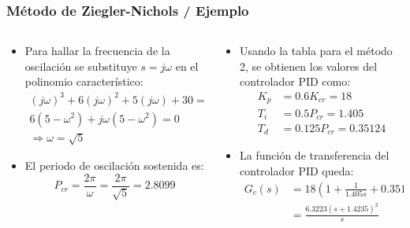 \documentclass[aspectratio=169]{beamer}
\theoremstyle{definition}
\theoremstyle{plain}
\theoremstyle{remark}
\begin{document}
\begin{frame}[<+->]\frametitle{Método de Ziegler-Nichols / Ejemplo}
\begin{columns}
\begin{column}{0.5\textwidth}
\small
\begin{itemize}
	\item Para hallar la frecuencia de la oscilación se substituye $s = j\omega$ en el polinomio característico:
	\begin{align*}
		(j\omega)^3 + 6(j\omega)^2 + 5(j\omega) + 30 = 0\\
		6(5 - \omega^2) + j\omega(5-\omega^2) = 0\\
		\Rightarrow \omega = \sqrt{5}
	\end{align*}
	\item El periodo de oscilación sostenida es:
	\begin{equation*}
		P_{cr} = \frac{2\pi}{\omega} = \frac{2\pi}{\sqrt{5}} = 2.8099
	\end{equation*}
\end{itemize}
\end{column}
\begin{column}{0.5\textwidth}
\small
\begin{itemize}
	\item Usando la tabla para el método 2, se obtienen los valores del controlador PID como:
	\begin{align*}
		K_p &= 0.6 K_{cr} = 18\\
		T_i &= 0.5 P_{cr} = 1.405\\
		T_d &= 0.125P_{cr} = 0.35124
	\end{align*}
	\item La función de transferencia del controlador PID queda:
	\begin{align*}
		G_c(s) &= 18 \left( 1 + \frac{1}{1.405s} + 0.35124 s \right)\\
		&= \frac{6.3223(s+1.4235)^2}{s}
	\end{align*}
\end{itemize}
\end{column}
\end{columns}
\end{frame}
\end{document}
